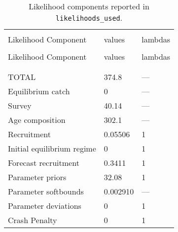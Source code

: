 
\setlength{\tabcolsep}{0pt}
\begin{longtable}[c]{>{\raggedright\let\newline\\\arraybackslash\hspace{0pt}}p{2.31in}>{\raggedleft\let\newline\\\arraybackslash\hspace{0pt}}p{1.35in}>{\raggedleft\let\newline\\\arraybackslash\hspace{0pt}}p{1.35in}}
  \caption{Likelihood components reported in \texttt{likelihoods\_used}.} \label{tab:like1}\\  \hline\\[-2.2ex]  Likelihood Component  & values & lambdas \\[0.2ex]\hline\\[-1.5ex]  \endfirsthead   \hline  Likelihood Component  & values & lambdas \\[0.2ex]\hline\\[-1.5ex]  \endhead  \hline\\[-2.2ex]   \endfoot  \hline \endlastfoot
  TOTAL & 374.8 & --- \\ 
  Equilibrium catch & 0 & --- \\ 
  Survey & 40.14 & --- \\ 
  Age composition & 302.1 & --- \\ 
  Recruitment & 0.05506 & 1 \\ 
  Initial equilibrium regime & 0 & 1 \\ 
  Forecast recruitment & 0.3411 & 1 \\ 
  Parameter priors & 32.08 & 1 \\ 
  Parameter softbounds & 0.002910 & --- \\ 
  Parameter deviations & 0 & 1 \\ 
  Crash Penalty & 0 & 1 \\ 
\end{longtable}\setlength{\tabcolsep}{0pt}

